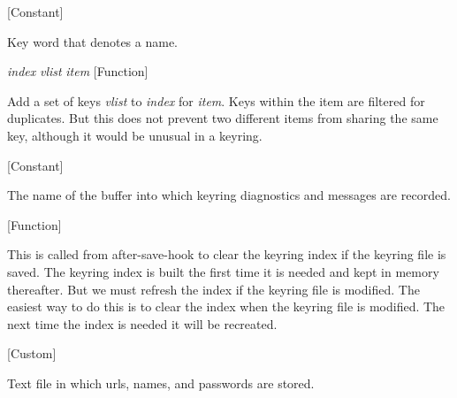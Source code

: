 \vspace{1em}
\noindent
{}
\usebox{\funcname}
 \hfill [Constant]

\begin{doc-string}
Key word that denotes a name.
\end{doc-string}

\vspace{1em}
\noindent
{}
\usebox{\funcname}\emph{index} \emph{vlist} \emph{item}
 \hfill [Function]

\begin{doc-string}
Add a set of keys \emph{vlist} to \emph{index} for \emph{item}.  Keys within the item are filtered for
duplicates.  But this does not prevent two different items from sharing the same key,
although it would be unusual in a keyring.
\end{doc-string}

\vspace{1em}
\noindent
{}
\usebox{\funcname}
 \hfill [Constant]

\begin{doc-string}
The name of the buffer into which keyring diagnostics and messages
are recorded.
\end{doc-string}

\vspace{1em}
\noindent
{}
\usebox{\funcname}
 \hfill [Function]

\begin{doc-string}
This is called from after-save-hook to clear the keyring index if the keyring file is saved.
The keyring index is built the first time it is needed and kept in memory thereafter.  But we
must refresh the index if the keyring file is modified.  The easiest way to do this is to clear
the index when the keyring file is modified.  The next time the index is needed it will be
recreated.
\end{doc-string}

\vspace{1em}
\noindent
{}
\usebox{\funcname}
 \hfill [Custom]

\begin{doc-string}
Text file in which urls, names, and passwords are stored.
\end{doc-string}

